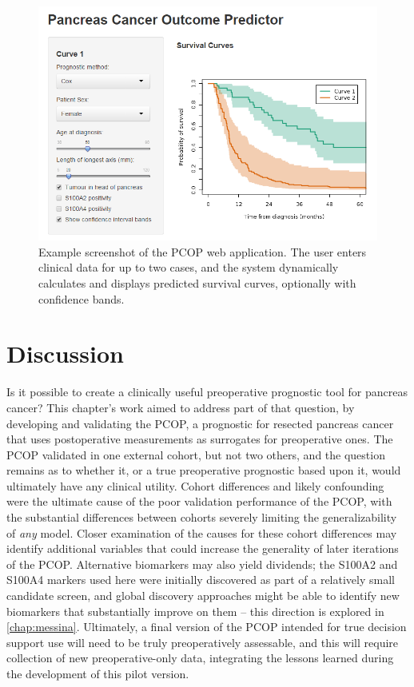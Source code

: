 \documentclass[dissertation.tex]{subfiles}
\begin{document}
\begin{figure}
\centering
  \includegraphics[width=1\linewidth]{analysis/nomogram/webapp/PCOP.png}
\caption[Example screenshot of the \acrshort{PCOP} web application]{Example screenshot of the \gls{PCOP} web application.  The user enters clinical data for up to two cases, and the system dynamically calculates and displays predicted survival curves, optionally with confidence bands.}
\label{fig:nomo-web-example}
\end{figure}

\section{Discussion}
Is it possible to create a clinically useful preoperative prognostic tool for pancreas cancer?  This chapter's work aimed to address part of that question, by developing and validating the \gls{PCOP}, a prognostic for resected pancreas cancer that uses postoperative measurements as surrogates for preoperative ones.  The \gls{PCOP} validated in one external cohort, but not two others, and the question remains as to whether it, or a true preoperative prognostic based upon it, would ultimately have any clinical utility.  Cohort differences and likely confounding were the ultimate cause of the poor validation performance of the \gls{PCOP}, with the substantial differences between cohorts severely limiting the generalizability of \emph{any} model.  Closer examination of the causes for these cohort differences may identify additional variables that could increase the generality of later iterations of the \gls{PCOP}.  Alternative biomarkers may also yield dividends; the S100A2 and S100A4 markers used here were initially discovered as part of a relatively small candidate screen, and global discovery approaches might be able to identify new biomarkers that substantially improve on them -- this direction is explored in \cref{chap:messina}.  Ultimately, a final version of the \gls{PCOP} intended for true decision support use will need to be truly preoperatively assessable, and this will require collection of new preoperative-only data, integrating the lessons learned during the development of this pilot version.
\end{document}
